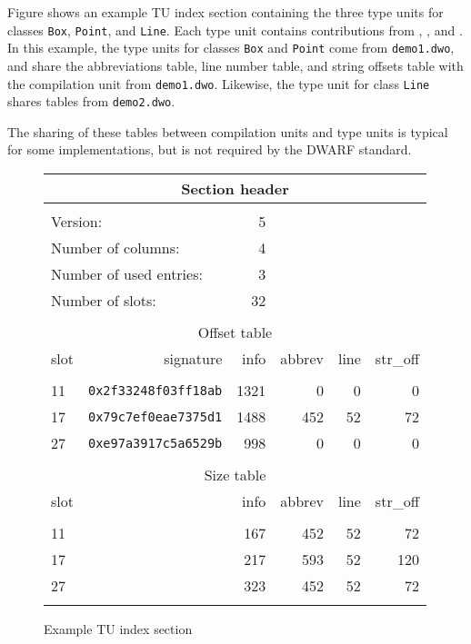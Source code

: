 Figure  
shows an example TU index section containing the
three type units for classes \texttt{Box}, \texttt{Point}, and 
\texttt{Line}. Each type unit
contains contributions from \dotdebuginfodwo{}, \dotdebugabbrevdwo{},
\dotdebuglinedwo{} and \dotdebugstroffsetsdwo{}. In this example, the
type units for classes \texttt{Box} and \texttt{Point} come from 
\texttt{demo1.dwo}, and
share the abbreviations table, line number table, and string
offsets table with the compilation unit from \texttt{demo1.dwo}. 
Likewise, the type unit for class \texttt{Line} shares tables 
from \texttt{demo2.dwo}. 

The sharing of these tables between compilation units and type units
is typical for some implementations, but is not required by the
DWARF standard.

\begin{figure}[ht]
\begin{center}
\begin{tabular}{lrrrrr}
\\
  \multicolumn{6}{c}{Section header} \\
\hline \\
  \multicolumn{2}{l}{Version:}&                 5 \\
  \multicolumn{2}{l}{Number of columns:}&       4 \\
  \multicolumn{2}{l}{Number of used entries:}&  3 \\
  \multicolumn{2}{l}{Number of slots:}&         32 \\
\\
  \multicolumn{6}{c}{Offset table} \\
  \hline
  slot&  signature&                    info&   abbrev&     line& str\_off \\ \\
  11& \texttt{0x2f33248f03ff18ab}&     1321&        0&        0&        0 \\
  17& \texttt{0x79c7ef0eae7375d1}&     1488&      452&       52&       72 \\
  27& \texttt{0xe97a3917c5a6529b}&      998&        0&        0&        0 \\
\\
  \multicolumn{6}{c}{Size table} \\
  \hline
  slot&                          &     info&   abbrev&     line& str\_off \\ \\
  11&                            &      167&      452&       52&       72 \\
  17&                            &      217&      593&       52&      120 \\
  27&                            &      323&      452&       52&       72 \\
\\
\hline
\end{tabular}
\end{center}
\caption{Example TU index section}
\label{fig:exampletuindexsection}
\end{figure}

